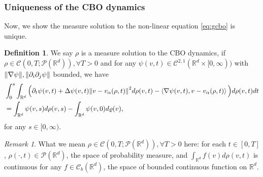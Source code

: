\documentclass[a4paper, 11pt]{article}
\newcommand{\inner}[2]{\left< #1 , #2 \right>}
\newcounter{results}[section]
\theoremstyle{plain}
\newtheorem{lemma}[results]{Lemma}
\theoremstyle{remark}
\newtheorem{remark}[results]{Remark}
\theoremstyle{definition}
\newtheorem{definition}[results]{Definition}
\newcommand{\intd}{\int_{\mathbb{R}^d}}
\newcommand{\Q}{Q}
\begin{document}
    
	
	
	
\subsubsection{Uniqueness of the CBO dynamics}
	Now, we show the measure solution to the non-linear equation \eqref{eq:gcbo} is unique.
\begin{definition}
    We say $\rho$ is a measure solution to the CBO dynamics, if $\rho\in\mathcal{C}(0,T;\mathcal{P}(\mathbb{R}^d)),\forall T>0$ and for any $\psi(v,t)\in \mathcal{C}^{2,1}(\mathbb{R}^d\times[0,\infty))$ with $\norm{\nabla\psi},\norm{\partial_i\partial_j\psi}$ bounded, we have
    \begin{equation}
        \begin{aligned}
            &\int_{0}^{s}\intd\Big(\partial_t\psi(v,t)+\Delta \psi(v,t)\norm{v-v_\alpha(\rho,t)}^2d\rho(v,t)-\inner{\nabla \psi(v,t)}{v-v_\alpha(\rho,t)}\Big)d\rho(v,t)dt\\
            &=\intd\psi(v,s)d\rho(v,s)-\intd\psi(v,0)d\varrho(v),
        \end{aligned}
    \end{equation}
    for any $s\in [0,\infty)$.
\end{definition}
\begin{remark}\label{rmke:2}
    What we mean $\rho\in\mathcal{C}(0,T;\mathcal{P}(\mathbb{R}^d)),\forall T>0$ here:  for each $t\in [0,T]$, $\rho(\cdot,t)\in\mathcal{P}(\mathbb{R}^d)$, the space of probability measure, and $\intd f(v)d\rho(v,t)$ is continuous for any $f\in \mathcal{C}_b(\mathbb{R}^d)$, the space of bounded continuous function on $\mathbb{R}^d$.
\end{remark}
\end{document}
